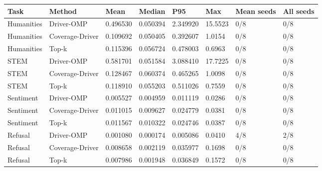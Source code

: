 \begin{tabular}{llllllll}
\toprule
Task & Method & Mean & Median & P95 & Max & Mean seeds & All seeds \\
\midrule
Humanities & Driver-OMP & 0.496530 & 0.050394 & 2.349920 & 15.5523 & 0/8 & 0/8 \\
Humanities & Coverage-Driver & 0.109692 & 0.050405 & 0.392607 & 1.0154 & 0/8 & 0/8 \\
Humanities & Top-k & 0.115396 & 0.056724 & 0.478003 & 0.6963 & 0/8 & 0/8 \\
STEM & Driver-OMP & 0.581701 & 0.051584 & 3.088410 & 17.7225 & 0/8 & 0/8 \\
STEM & Coverage-Driver & 0.128467 & 0.060374 & 0.465265 & 1.0098 & 0/8 & 0/8 \\
STEM & Top-k & 0.118910 & 0.055203 & 0.511026 & 0.7559 & 0/8 & 0/8 \\
Sentiment & Driver-OMP & 0.005527 & 0.004959 & 0.011119 & 0.0286 & 0/8 & 0/8 \\
Sentiment & Coverage-Driver & 0.011015 & 0.009627 & 0.024779 & 0.0381 & 0/8 & 0/8 \\
Sentiment & Top-k & 0.011567 & 0.010322 & 0.024746 & 0.0387 & 0/8 & 0/8 \\
Refusal & Driver-OMP & 0.001080 & 0.000174 & 0.005086 & 0.0410 & 4/8 & 2/8 \\
Refusal & Coverage-Driver & 0.008658 & 0.002119 & 0.035977 & 0.1698 & 0/8 & 0/8 \\
Refusal & Top-k & 0.007986 & 0.001948 & 0.036849 & 0.1572 & 0/8 & 0/8 \\
\bottomrule
\end{tabular}
